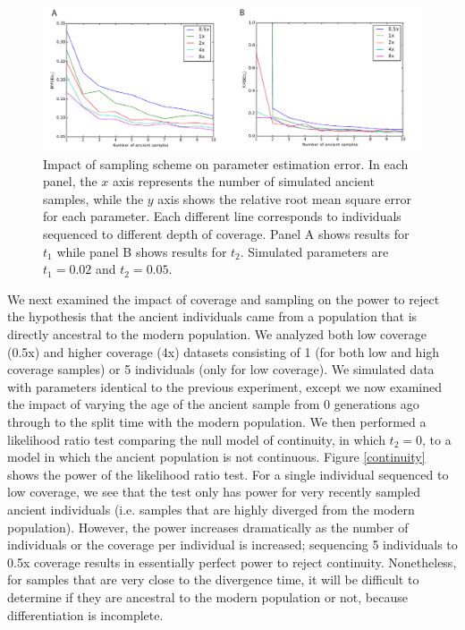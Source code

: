 \documentclass[11pt, oneside]{article}   	%
\begin{document}
\begin{figure}[!h] %
   \centering
   \includegraphics[width=\textwidth]{RMSE_Figure.pdf} 
   \caption{Impact of sampling scheme on parameter estimation error. In each panel, the $x$ axis represents the number of simulated ancient samples, while the $y$ axis shows the relative root mean square error for each parameter. Each different line corresponds to individuals sequenced to different depth of coverage. Panel A shows results for $t_1$ while panel B shows results for $t_2$. Simulated parameters are $t_1 = 0.02$ and $t_2 = 0.05$.}
   \label{RMSE}
\end{figure}

We next examined the impact of coverage and sampling on the power to reject the hypothesis that the ancient individuals came from a population that is directly ancestral to the modern population. We analyzed both low coverage (0.5x) and higher coverage (4x) datasets consisting of 1 (for both low and high coverage samples) or 5 individuals (only for low coverage). We simulated data with parameters identical to the previous experiment, except we now examined the impact of varying the age of the ancient sample from 0 generations ago through to the split time with the modern population. We then performed a likelihood ratio test comparing the null model of continuity, in which $t_2 = 0$, to a model in which the ancient population is not continuous. Figure \ref{continuity} shows the power of the likelihood ratio test. For a single individual sequenced to low coverage, we see that the test only has power for very recently sampled ancient individuals (i.e. samples that are highly diverged from the modern population). However, the power increases dramatically as the number of individuals or the coverage per individual is increased; sequencing 5 individuals to 0.5x coverage results in essentially perfect power to reject continuity. Nonetheless, for samples that are very close to the divergence time, it will be difficult to determine if they are ancestral to the modern population or not, because differentiation is incomplete.
\end{document}
